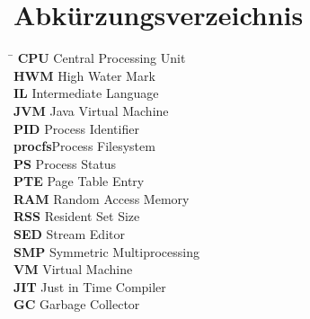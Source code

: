 \documentclass{fancydocument}
\begin{document}
\section{Abk\"urzungsverzeichnis}
\begin{tabbing}
\hspace*{2cm}\=\kill
\textbf{CPU} \>Central Processing Unit\\
\textbf{HWM} \>High Water Mark\\
\textbf{IL} \>Intermediate Language\\
\textbf{JVM} \>Java Virtual Machine\\
\textbf{PID} \>Process Identifier\\
\textbf{procfs}\>Process Filesystem\\
\textbf{PS} \>Process Status\\
\textbf{PTE} \>Page Table Entry\\
\textbf{RAM} \>Random Access Memory\\
\textbf{RSS} \>Resident Set Size\\
\textbf{SED} \>Stream Editor\\
\textbf{SMP} \>Symmetric Multiprocessing\\
\textbf{VM} \>Virtual Machine\\
\textbf{JIT} \>Just in Time Compiler\\
\textbf{GC} \>Garbage Collector\\
\end{tabbing}
\end{document}
